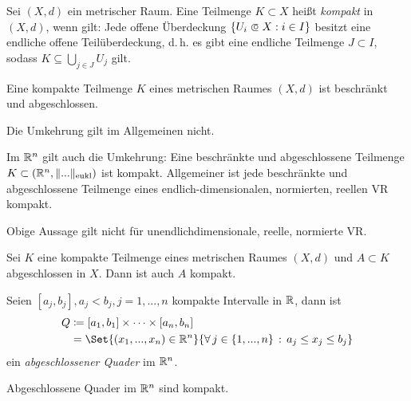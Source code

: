 \documentclass{cheat-sheet}
\begin{document}
\begin{defn}
Sei $(X, d)$ ein metrischer Raum. Eine Teilmenge $K \subset X$ heißt \emph{kompakt} in $(X, d)$, wenn gilt: Jede offene Überdeckung $\{ U_i \opn X : i \in I \}$ besitzt eine endliche offene Teilüberdeckung, d.\,h. es gibt eine endliche Teilmenge $J \subset I$, sodass $K \subseteq \bigcup_{j \in J} U_j$ gilt.
\end{defn}


\begin{satz}
Eine kompakte Teilmenge $K$ eines metrischen Raumes $(X, d)$ ist beschränkt und abgeschlossen.
\end{satz}

\begin{acht}
Die Umkehrung gilt im Allgemeinen nicht.
\end{acht}

\begin{satz}
Im $\mathbb{R}^n$ gilt auch die Umkehrung: Eine beschränkte und abgeschlossene Teilmenge $K \subset (\mathbb{R}^n, \| ... \|_\text{eukl})$ ist kompakt. Allgemeiner ist jede beschränkte und abgeschlossene Teilmenge eines endlich-dimensionalen, normierten, reellen VR kompakt.
\end{satz}

\begin{acht}
Obige Aussage gilt nicht für unendlichdimensionale, reelle, normierte VR.
\end{acht}


\begin{satz}
Sei $K$ eine kompakte Teilmenge eines metrischen Raumes $(X, d)$ und $A \subset K$ abgeschlossen in $X$. Dann ist auch $A$ kompakt.
\end{satz}

\begin{defn}
Seien $[a_j, b_j], a_j < b_j, j = 1, ..., n$ kompakte Intervalle in $\mathbb{R}$, dann ist
\begin{align*}
  Q &\coloneqq [a_1, b_1] \times \cdots \times [a_n, b_n]\\
  &= \Set{ (x_1, ..., x_n) \in \R^n }{ \fa{j \in \{ 1, ..., n \}} a_j \le x_j \le b_j }
\end{align*}
ein \emph{abgeschlossener Quader} im $\mathbb{R}^n$.
\end{defn}

\begin{satz}
Abgeschlossene Quader im $\mathbb{R}^n$ sind kompakt.
\end{satz}
\end{document}
